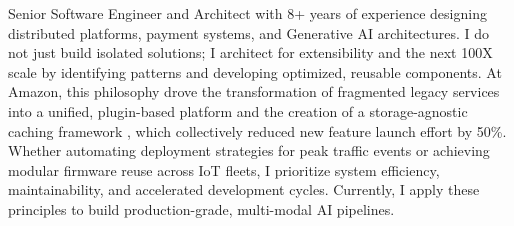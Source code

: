 

\begin{cvparagraph}

Senior Software Engineer and Architect with 8+ years of experience designing distributed platforms, payment systems, and Generative AI architectures. I do not just build isolated solutions; I architect for extensibility and the next 100X scale by identifying patterns and developing optimized, reusable components. At Amazon, this philosophy drove the transformation of fragmented legacy services into a unified, plugin-based platform and the creation of a storage-agnostic caching framework , which collectively reduced new feature launch effort by 50\%. Whether automating deployment strategies for peak traffic events or achieving modular firmware reuse across IoT fleets, I prioritize system efficiency, maintainability, and accelerated development cycles. Currently, I apply these principles to build production-grade, multi-modal AI pipelines.
\end{cvparagraph}
